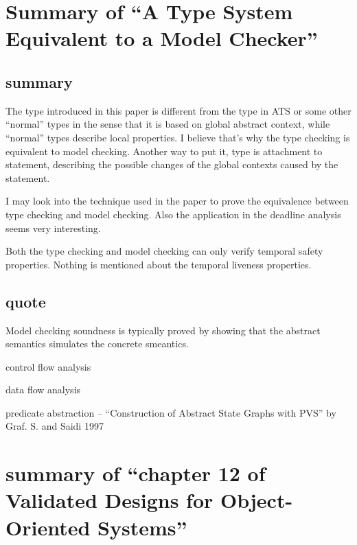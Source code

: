 \documentclass{llncs}
\begin{document}
\newpage
\section{Summary of ``A Type System Equivalent to a Model Checker''\cite{Naik2008Type}} 
  \label{section:type_eq_model_checker}
\subsection{summary}
The type introduced in this paper is different from the type in ATS or 
some other ``normal'' types in the sense that it is based on global abstract
context, while ``normal'' types describe local properties. I believe that's
why the type checking is equivalent to model checking. Another way to put it,
type is attachment to statement, describing the possible changes of the global
contexts caused by the statement.

I may look into the technique used in the paper to prove the equivalence between
type checking and model checking. Also the application in the deadline analysis
seems very interesting.

Both the type checking and model checking can only verify temporal safety properties.
Nothing is mentioned about the temporal liveness properties.

\subsection{quote}
Model checking soundness is typically proved by showing that the abstract
semantics simulates the concrete smeantics.

control flow analysis

data flow analysis

predicate abstraction -- ``Construction of Abstract State Graphs with PVS'' by
Graf. S. and Saidi 1997






\newpage
\section{summary of ``chapter 12 of Validated Designs for 
Object-Oriented Systems''\cite{Fitzgerald2005Validated}} \label{section:vdmoo}
\end{document}
